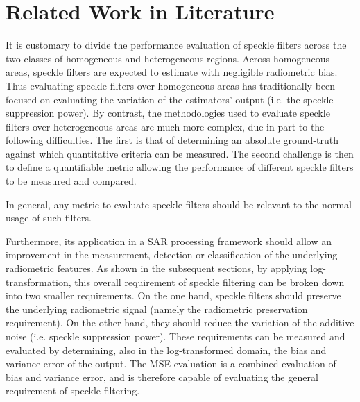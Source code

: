 \documentclass[journal]{IEEEtran}
\begin{document}
\section{Related Work in Literature}
\label{sec:lit_review}

It is customary to divide the performance evaluation of speckle filters across the two classes of 
	homogeneous and heterogeneous regions.
Across homogeneous areas,
	speckle filters are expected to estimate with negligible radiometric bias.
Thus evaluating speckle filters over homogeneous areas has traditionally been focused on evaluating the variation of the estimators' output (i.e. the speckle suppression power).
By contrast, the methodologies used to evaluate speckle filters over heterogeneous areas are much more complex, due in part to the following difficulties.
The first is that of determining an absolute ground-truth against which quantitative criteria can be measured.
The second challenge is then to define a quantifiable metric allowing the performance of different speckle filters to be measured and compared.

In general, any metric to evaluate speckle filters should be relevant to the normal usage of such filters. 








Furthermore, its application in a SAR processing framework should allow an improvement in the measurement, detection or classification of the underlying radiometric features.
As shown in the subsequent sections, by applying log-transformation, 
	this overall requirement of speckle filtering can be broken down into two smaller requirements.
On the one hand, speckle filters should preserve the underlying radiometric signal (namely the radiometric preservation requirement).
On the other hand, they should reduce the variation of the additive noise (i.e. speckle suppression power).
These requirements can be measured and evaluated by determining, also in the log-transformed domain, the bias and variance error of the output.
The MSE evaluation is a combined evaluation of bias and variance error, and is therefore capable of evaluating the general requirement of speckle filtering.
\end{document}
